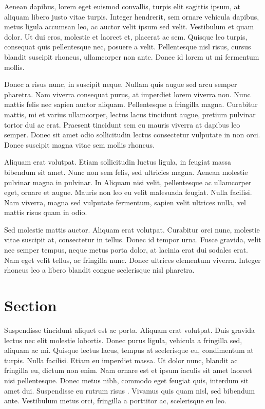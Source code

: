 Aenean dapibus, lorem eget euismod convallis, turpis elit sagittis ipsum, at aliquam libero justo vitae turpis. Integer hendrerit, sem ornare vehicula dapibus, metus ligula accumsan leo, ac auctor velit ipsum sed velit. Vestibulum et quam dolor. Ut dui eros, molestie et laoreet et, placerat ac sem. Quisque leo turpis, consequat quis pellentesque nec, posuere a velit. Pellentesque nisl risus, cursus blandit suscipit rhoncus, ullamcorper non ante. Donec id lorem ut mi fermentum mollis. 

Donec a risus nunc, in suscipit neque. Nullam quis augue sed arcu semper pharetra. Nam viverra consequat purus, at imperdiet lorem viverra non. Nunc mattis felis nec sapien auctor aliquam. Pellentesque a fringilla magna. Curabitur mattis, mi et varius ullamcorper, lectus lacus tincidunt augue, pretium pulvinar tortor dui ac erat. Praesent tincidunt sem eu mauris viverra at dapibus leo semper. Donec sit amet odio sollicitudin lectus consectetur vulputate in non orci. Donec suscipit magna vitae sem mollis rhoncus.

Aliquam erat volutpat. Etiam sollicitudin luctus ligula, in feugiat massa bibendum sit amet. Nunc non sem felis, sed ultricies magna. Aenean molestie pulvinar magna in pulvinar. In  \cite{Comer2006uq} Aliquam nisi velit, pellentesque ac ullamcorper eget, ornare et augue. Mauris non leo eu velit malesuada feugiat. Nulla facilisi. Nam viverra, magna sed vulputate fermentum, sapien velit ultrices nulla, vel mattis risus quam in odio. 

Sed molestie mattis auctor. Aliquam erat volutpat. Curabitur orci nunc, molestie vitae suscipit at, consectetur in tellus. Donec id tempor urna. Fusce gravida, velit nec semper tempus, neque metus porta dolor, at lacinia erat dui sodales erat. Nam eget velit tellus, ac fringilla nunc. Donec ultrices elementum viverra. Integer rhoncus leo a libero blandit congue scelerisque nisl pharetra. 

\section{Section}
Suspendisse tincidunt aliquet est ac porta. Aliquam erat volutpat. Duis gravida lectus nec elit molestie lobortis. Donec purus ligula, vehicula a fringilla sed, aliquam ac mi. Quisque lectus lacus, tempus at scelerisque eu, condimentum at turpis. Nulla facilisi. Etiam eu imperdiet massa. Ut dolor nunc, blandit ac fringilla eu, dictum non enim. Nam ornare est et ipsum iaculis sit amet laoreet nisi pellentesque. Donec metus nibh, commodo eget feugiat quis, interdum sit amet dui. Suspendisse eu rutrum risus \cite{jain2004ass}. Vivamus quis quam nisl, sed bibendum ante. Vestibulum metus orci, fringilla a porttitor ac, scelerisque eu leo. 

